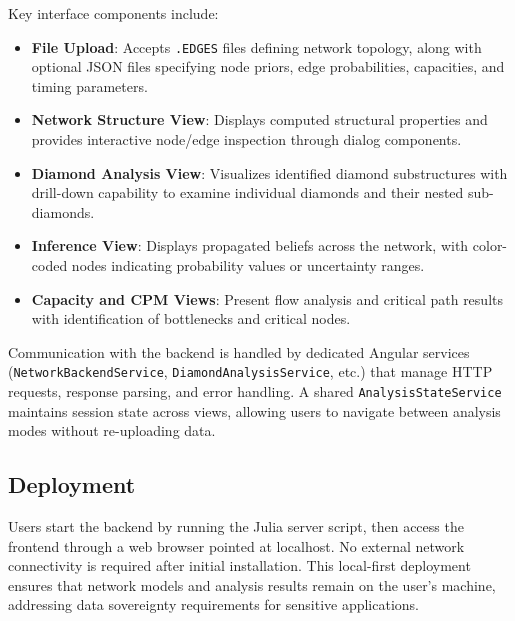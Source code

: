 \documentclass[conference]{IEEEtran}
\begin{document}
Key interface components include:
\begin{itemize}
    \item \textbf{File Upload}: Accepts \texttt{.EDGES} files defining network topology, along with optional JSON files specifying node priors, edge probabilities, capacities, and timing parameters.
    \item \textbf{Network Structure View}: Displays computed structural properties and provides interactive node/edge inspection through dialog components.
    \item \textbf{Diamond Analysis View}: Visualizes identified diamond substructures with drill-down capability to examine individual diamonds and their nested sub-diamonds.
    \item \textbf{Inference View}: Displays propagated beliefs across the network, with color-coded nodes indicating probability values or uncertainty ranges.
    \item \textbf{Capacity and CPM Views}: Present flow analysis and critical path results with identification of bottlenecks and critical nodes.
\end{itemize}

Communication with the backend is handled by dedicated Angular services (\texttt{NetworkBackendService}, \texttt{DiamondAnalysisService}, etc.) that manage HTTP requests, response parsing, and error handling. A shared \texttt{AnalysisStateService} maintains session state across views, allowing users to navigate between analysis modes without re-uploading data.

\subsection{Deployment}

Users start the backend by running the Julia server script, then access the frontend through a web browser pointed at localhost. No external network connectivity is required after initial installation. This local-first deployment ensures that network models and analysis results remain on the user's machine, addressing data sovereignty requirements for sensitive applications.
\end{document}
